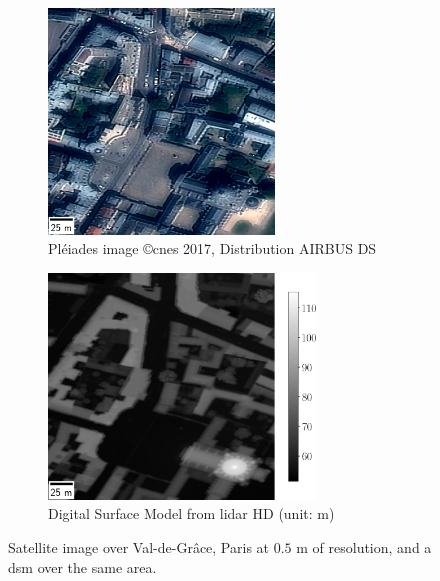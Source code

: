 \begin{figure}
    \centering
    \begin{subfigure}[t]{0.48\linewidth}
        \centering
        \includegraphics[height=6cm]{Images/0_Intro/Paris_Ortho.png}
        \caption{Pléiades image \copyright \acrshort{cnes} 2017, Distribution AIRBUS DS}
        \label{fig:VDG_ortho}
    \end{subfigure}\hfill
    \begin{subfigure}[t]{0.48\linewidth}
        \flushright
        \includegraphics[height=6cm]{Images/0_Intro/Paris_DSM.png}
        \caption{Digital Surface Model from \acrshort{lidar} HD (unit: m)}
        \label{fig:VDG_dsm}
    \end{subfigure}
    \caption{Satellite image over Val-de-Grâce, Paris at $0.5$ m of resolution, and a \acrshort{dsm} over the same area.}
    \label{fig:intro_dsm_example}
\end{figure}

